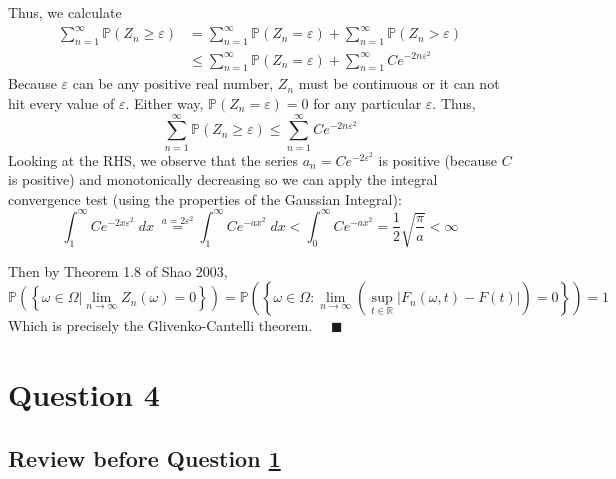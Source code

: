 \documentclass[11pt,letterpaper, leqno]{article}
\numberwithin{equation}{section}
\numberwithin{theorem}{section}
\numberwithin{lemma}{section}
\numberwithin{corollary}{section}
\numberwithin{definition}{section}
\numberwithin{proposition}{section}
\numberwithin{remark}{section}
\numberwithin{example}{section}
\renewcommand{\P}{\mathbb{P}}
\newcommand{\R}{\mathbb{R}}
\renewcommand{\qed}{\quad \blacksquare}
\begin{document}
    Thus, we calculate 
    \begin{align*}
        \sum_{n=1}^\infty \P(Z_n \geq \varepsilon) &= \sum_{n=1}^\infty \P(Z_n = \varepsilon) + \sum_{n=1}^\infty \P(Z_n > \varepsilon)\\
        &\leq \sum_{n=1}^\infty \P(Z_n = \varepsilon) + \sum_{n=1}^\infty Ce^{-2n\varepsilon^2}
    \end{align*}
    Because $\varepsilon$ can be any positive real number, $Z_n$ must be continuous or it can not hit every value of $\varepsilon$. Either way, $\P(Z_n = \varepsilon) = 0$ for any particular $\varepsilon$. Thus, 
    \[\sum_{n=1}^\infty \P(Z_n \geq \varepsilon) \leq \sum_{n=1}^\infty Ce^{-2n\varepsilon^2}\]
    Looking at the RHS, we observe that the series $a_n = Ce^{-2\varepsilon^2}$ is positive (because $C$ is positive) and monotonically decreasing so we can apply the integral convergence test (using the properties of the Gaussian Integral):
    \[\int_1^\infty Ce^{-2x\varepsilon^2}\;dx \; \overset{a = 2\varepsilon^2}{=} \int_1^\infty Ce^{-ax^2}\; dx < \int_0^\infty Ce^{-ax^2} = \frac{1}{2}\sqrt{\frac{\pi}{a}} < \infty\]

    Then by Theorem 1.8 of Shao 2003, 
    \[\P\left(\left\{\omega \in \Omega \Big \vert \lim_{n\to \infty} Z_n(\omega) = 0 \right\}\right) = \P\left(\left\{\omega \in \Omega: \lim_{n\to \infty} \left(\sup_{t\in\R} \big\vert F_n(\omega, t) - F(t) \big\vert\right) = 0 \right\}\right) = 1\]
    Which is precisely the Glivenko-Cantelli theorem. $\qed$
\color{black}

\pagebreak
\section{Question 4}\label{Q4}

\subsection{Review before Question \ref{Q4}}
\end{document}
